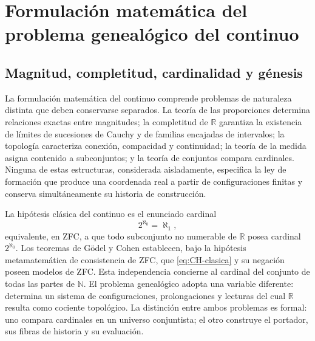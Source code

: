 \section{Formulaci\'on matem\'atica del problema geneal\'ogico del continuo}
\label{sec:formulacion-genealogica-continuo}

\subsection{Magnitud, completitud, cardinalidad y g\'enesis}

La formulaci\'on matem\'atica del continuo comprende problemas de naturaleza
distinta que deben conservarse separados. La teor\'ia de las proporciones
determina relaciones exactas entre magnitudes; la completitud de
\(\mathbb R\) garantiza la existencia de l\'imites de sucesiones de Cauchy y
de familias encajadas de intervalos; la topolog\'ia caracteriza conexi\'on,
compacidad y continuidad; la teor\'ia de la medida asigna contenido a
subconjuntos; y la teor\'ia de conjuntos compara cardinales. Ninguna de estas
estructuras, considerada aisladamente, especifica la ley de formaci\'on que
produce una coordenada real a partir de configuraciones finitas y conserva
simult\'aneamente su historia de construcci\'on.

La hip\'otesis cl\'asica del continuo es el enunciado cardinal
\begin{equation}
 2^{\aleph_0}=\aleph_1,
 \label{eq:CH-clasica}
\end{equation}
equivalente, en ZFC, a que todo subconjunto no numerable de
\(\mathbb R\) posea cardinal \(2^{\aleph_0}\). Los teoremas de G\"odel y
Cohen establecen, bajo la hip\'otesis metamatem\'atica de consistencia de ZFC,
que \eqref{eq:CH-clasica} y su negaci\'on poseen modelos de ZFC. Esta
independencia concierne al cardinal del conjunto de todas las partes de
\(\mathbb N\). El problema geneal\'ogico adopta una variable diferente:
determina un sistema de configuraciones, prolongaciones y lecturas del cual
\(\mathbb R\) resulta como cociente topol\'ogico. La distinci\'on entre ambos
problemas es formal: uno compara cardinales en un universo conjuntista; el
otro construye el portador, sus fibras de historia y su evaluaci\'on.

